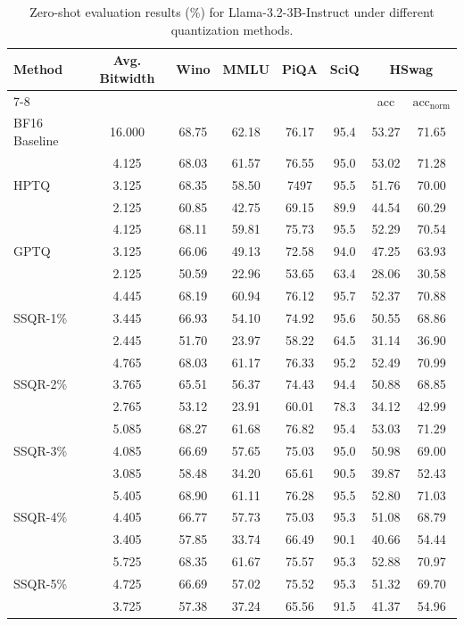\documentclass{article} %
\begin{document}
\begin{table}[htpb]
\caption{Zero-shot evaluation results (\%) for Llama-3.2-3B-Instruct under different quantization methods.}
\label{tab:llama3.2_3b_eval_tasks}
\begin{center}
\begin{tabular}{lccccccc}
\toprule
Method & Avg. Bitwidth & Wino & MMLU & PiQA & SciQ & \multicolumn{2}{c}{HSwag}  \\
\cmidrule(r){7-8}
      &           &      &      &      &      & acc & $\text{acc}_\text{norm}$ \\
\midrule
BF16 Baseline & 16.000 & 68.75 & 62.18 & 76.17 & 95.4 & 53.27 & 71.65 \\
\midrule
\multirow{3}{*}{HPTQ} & 4.125 & 68.03 & 61.57 & 76.55 & 95.0 & 53.02 & 71.28 \\
           & 3.125 & 68.35 & 58.50 & 7497 & 95.5 & 51.76 & 70.00 \\
           & 2.125 & 60.85 & 42.75 & 69.15 & 89.9 & 44.54 & 60.29  \\
\midrule
\multirow{3}{*}{GPTQ} & 4.125 & 68.11 & 59.81 & 75.73 & 95.5 & 52.29 & 70.54 \\
           & 3.125 & 66.06 & 49.13 & 72.58 & 94.0 & 47.25 & 63.93 \\
           & 2.125 & 50.59 & 22.96 & 53.65 & 63.4 & 28.06 & 30.58 \\
\midrule
\multirow{3}{*}{SSQR-1\%} 
 & 4.445 & 68.19 & 60.94 & 76.12 & 95.7 & 52.37 & 70.88 \\
 & 3.445 & 66.93 & 54.10 & 74.92	& 95.6 & 50.55 & 68.86 \\
 & 2.445 & 51.70 & 23.97 & 58.22 & 64.5 & 31.14 & 36.90 \\
\midrule
\multirow{3}{*}{SSQR-2\%}  
 & 4.765 & 68.03 & 61.17 & 76.33 & 95.2 & 52.49 & 70.99 \\
 & 3.765 & 65.51 & 56.37 & 74.43 & 94.4 & 50.88 & 68.85 \\
 & 2.765 & 53.12 & 23.91 & 60.01 & 78.3 & 34.12 & 42.99 \\
\midrule
\multirow{3}{*}{SSQR-3\%}  
 & 5.085 & 68.27 & 61.68 & 76.82 & 95.4 & 53.03 & 71.29 \\
 & 4.085 & 66.69 & 57.65 & 75.03 & 95.0 & 50.98 & 69.00 \\
 & 3.085 & 58.48 & 34.20 & 65.61 & 90.5 & 39.87 & 52.43 \\
\midrule
\multirow{3}{*}{SSQR-4\%}  
 & 5.405 & 68.90 & 61.11 & 76.28 & 95.5 & 52.80 & 71.03 \\
 & 4.405 & 66.77 & 57.73 & 75.03 & 95.3 & 51.08 & 68.79 \\
 & 3.405 & 57.85 & 33.74 & 66.49 & 90.1 & 40.66 & 54.44\\
\midrule
\multirow{3}{*}{SSQR-5\%}  
 & 5.725 & 68.35 & 61.67 & 75.57 & 95.3 & 52.88 & 70.97 \\
 & 4.725 & 66.69 & 57.02 & 75.52 & 95.3 & 51.32 & 69.70 \\
 & 3.725 & 57.38 & 37.24 & 65.56 & 91.5 & 41.37 & 54.96 \\
\bottomrule
\end{tabular}
\end{center}
\end{table}
\end{document}
